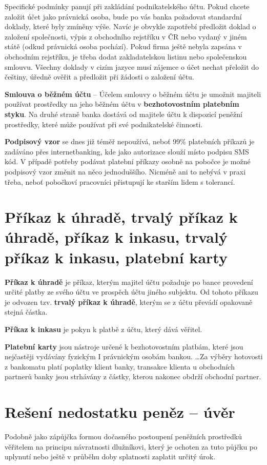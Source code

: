 Specifické podmínky panují při zakládání podnikatelského účtu. Pokud chcete založit účet jako právnická osoba, bude po vás banka požadovat standardní doklady, které byly zmíněny výše. Navíc je obvykle zapotřebí předložit doklad o založení společnosti, výpis z obchodního rejstříku v ČR nebo vydaný v jiném státě (odkud právnická osoba pochází). Pokud firma ještě nebyla zapsána v obchodním rejstříku, je třeba dodat zakladatelskou listinu nebo společenskou smlouvu. Všechny doklady v cizím jazyce musí zájemce o účet nechat přeložit do češtiny, úředně ověřit a předložit při žádosti o založení účtu.

\textbf{Smlouva o běžném účtu} -- Účelem smlouvy o běžném účtu je umožnit majiteli používat prostředky na jeho běžném účtu v \textbf{bezhotovostním platebním styku}. Na druhé straně banka dostává od majitele účtu k dispozicí peněžní prostředky, které může používat při své podnikatelské činnosti.

\textbf{Podpisový vzor} se dnes již téměř nepoužívá, neboť 99\% platebních příkazů je zadáváno přes internetbanking, kde jako autorizace slouží místo podpisu SMS kód. V případě potřeby podávat platební příkazy osobně na pobočce je možné podpisový vzor změnit na něco jednoduššího. Nicméně ani to nebývá v praxi třeba, neboť pobočkoví pracovníci přistupují ke starším lidem s tolerancí.

\section*{Příkaz k úhradě, trvalý příkaz k úhradě, příkaz k inkasu, trvalý příkaz k inkasu, platební karty}

\textbf{Příkaz k úhradě} je příkaz, kterým majitel účtu požaduje po bance provedení určité platby ze svého účtu ve prospěch účtu jiného subjektu. Od tohoto příkazu je odvozen tzv. \textbf{trvalý příkaz k úhradě}, kterým se z účtu převádí opakovaně stejná částka.

\textbf{Příkaz k inkasu} je pokyn k platbě z účtu, který dává věřitel.

\textbf{Platební karty} jsou nástroje určené k bezhotovostním platbám, které jsou nejčastěji vydávány fyzickým I právnickým osobám bankou. \ldots Za výběry hotovosti z bankomatu platí poplatky klient banky, transakce klienta u obchodních partnerů banky jsou strhávány z částky, kterou nakonec obdrží obchodní partner.

\section*{Rešení nedostatku peněz -- úvěr}
Podobně jako zápůjčka formou dočasného postoupení peněžních prostředků věřitelem na principu návratnosti dlužníkovi, který je ochoten za tuto půjčku po uplynutí nebo ještě v průběhu doby splatnosti zaplatit určitý úrok.

